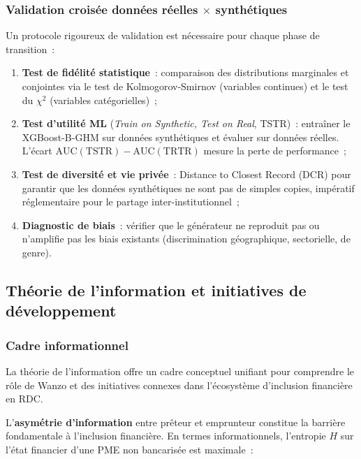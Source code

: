 \documentclass[12pt, a4paper, twocolumn]{article}
\begin{document}
\subsubsection{Validation croisée données réelles $\times$ synthétiques}
\label{subsubsec:validation_croisee}

Un protocole rigoureux de validation est nécessaire pour chaque phase de transition~:

\begin{enumerate}[leftmargin=*]
  \item \textbf{Test de fidélité statistique}~: comparaison des distributions marginales et conjointes via le test de Kolmogorov-Smirnov (variables continues) et le test du $\chi^2$ (variables catégorielles)~;
  \item \textbf{Test d'utilité ML} (\textit{Train on Synthetic, Test on Real}, TSTR)~: entraîner le XGBoost-B-GHM sur données synthétiques et évaluer sur données réelles. L'écart $\text{AUC}(\text{TSTR}) - \text{AUC}(\text{TRTR})$ mesure la perte de performance~;
  \item \textbf{Test de diversité et vie privée}~: Distance to Closest Record (DCR) pour garantir que les données synthétiques ne sont pas de simples copies, impératif réglementaire pour le partage inter-institutionnel~;
  \item \textbf{Diagnostic de biais}~: vérifier que le générateur ne reproduit pas ou n'amplifie pas les biais existants (discrimination géographique, sectorielle, de genre).
\end{enumerate}

\subsection{Théorie de l'information et initiatives de développement}
\label{subsec:discuss_info}

\subsubsection{Cadre informationnel}
\label{subsubsec:cadre_info}

La théorie de l'information offre un cadre conceptuel unifiant pour comprendre le rôle de Wanzo et des initiatives connexes dans l'écosystème d'inclusion financière en RDC.

L'\textbf{asymétrie d'information} entre prêteur et emprunteur constitue la barrière fondamentale à l'inclusion financière. En termes informationnels, l'entropie $H$ sur l'état financier d'une PME non bancarisée est maximale~:
\end{document}
